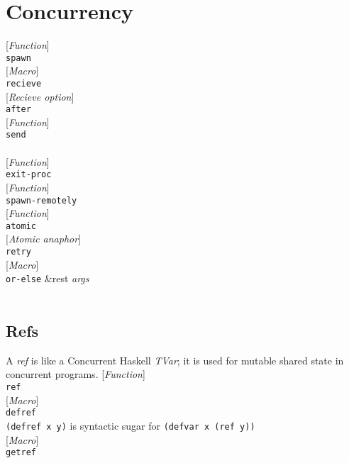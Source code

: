 \documentclass[10pt]{book}
\newenvironment{defother}[2]{[\textit{#1}]\\\texttt{#2}}{\\}
\newenvironment{defun}[1]{\begin{defother}{Function}{#1}}{\end{defother}}
\newenvironment{defmacro}[1]{\begin{defother}{Macro}{#1}}{\end{defother}}
\begin{document}
\chapter{Concurrency}
\begin{defun}{spawn}\end{defun}
\begin{defmacro}{recieve}\end{defmacro} %
\begin{defother}{Recieve option}{after}\end{defother} %
\begin{defun}{send}\end{defun} %
\\\begin{defun}{exit-proc}\end{defun} %
\begin{defun}{spawn-remotely}\end{defun}
\begin{defun}{atomic}\end{defun} %
\begin{defother}{Atomic anaphor}{retry}\end{defother}
\begin{defmacro}{or-else} \&rest \textit{args}\\
\end{defmacro}
\section{Refs}
A \textit{ref} is like a Concurrent Haskell \textit{TVar}; it is used for mutable shared state in concurrent programs.
\begin{defun}{ref}\end{defun}
\begin{defmacro}{defref}\\
\texttt{(defref x y)} is syntactic sugar for \texttt{(defvar x (ref y))} \end{defmacro}
\begin{defmacro}{getref}\end{defmacro} %
\end{document}
